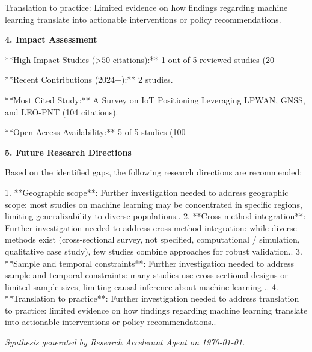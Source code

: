 \documentclass[11pt,a4paper]{article}
\begin{document}
\begin{gapbox}[Gap 4]
Translation to practice: Limited evidence on how findings regarding machine learning  translate into actionable interventions or policy recommendations.
\end{gapbox}

\vspace{0.3em}


\vspace{1em}
\textbf{\large 4. Impact Assessment}\par\vspace{0.5em}

**High-Impact Studies (>$50$ citations):** 1 out of 5 reviewed studies (20%

**Recent Contributions (2024+):** 2 studies.

**Most Cited Study:** A Survey on IoT Positioning Leveraging LPWAN, GNSS, and LEO-PNT (104 citations).

**Open Access Availability:** 5 of 5 studies (100%

\vspace{1em}


\textbf{\large 5. Future Research Directions}\par\vspace{0.5em}

Based on the identified gaps, the following research directions are recommended:

1. **Geographic scope**: Further investigation needed to address geographic scope: most studies on machine learning  may be concentrated in specific regions, limiting generalizability to diverse populations..
2. **Cross-method integration**: Further investigation needed to address cross-method integration: while diverse methods exist (cross-sectional survey, not specified, computational / simulation, qualitative case study), few studies combine approaches for robust validation..
3. **Sample and temporal constraints**: Further investigation needed to address sample and temporal constraints: many studies use cross-sectional designs or limited sample sizes, limiting causal inference about machine learning ..
4. **Translation to practice**: Further investigation needed to address translation to practice: limited evidence on how findings regarding machine learning  translate into actionable interventions or policy recommendations..

\vspace{1em}


\vfill
\begin{center}
\textit{Synthesis generated by Research Accelerant Agent on \today.}
\end{center}
\end{document}
